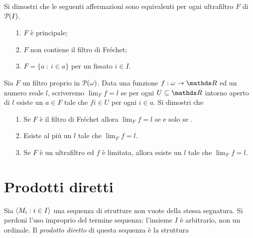 \begin{exercise}
Si dimostri che le seguenti affermazioni sono equivalenti per ogni ultrafiltro $F$ di $\P(I)$.\nobreak
\begin{itemize}
\item[1.] $F$ \`e principale;
\item[2.] $F$ non contiene il filtro di Fr\'echet;
\item[3.] $F=\{a\ :\ i\in a\}$ per un fissato $i\in I$.\QED
\end{itemize}
\end{exercise}


\begin{exercise}\label{exlimiteultrafiltro}
Sia $F$ un filtro proprio in $\P(\omega)$. Data una funzione $f:\omega\imp\RR$ ed un numero reale $l$, scriveremo $\lim_{F} f= l$ se per ogni $U\subseteq\RR$ intorno aperto di $l$ esiste un $a\in F$ tale che $fi\in U$ per ogni $i\in a$. Si dimostri che
\begin{itemize}
\item[1.] Se $F$ \`e il filtro di Fr\'echet allora $\lim_{F} f= l$ se e solo se  .
\item[2.] Esiste al pi\`u un $l$ tale che $\lim_{F} f= l$.
\item[3.] Se $F$ \`e un ultrafiltro ed $f$ \`e limitata, allora esiste un $l$ tale che  $\lim_{F} f= l$.\QED
\end{itemize}
\end{exercise}



\section{Prodotti diretti}
\label{prodottidiretti}

\def\ceq#1#2#3{\parbox{20ex}{$\displaystyle #1$}\parbox{6ex}{\hfil$\displaystyle #2$}\rlap{$\displaystyle  #3$}\hspace{20ex}}

Sia $\<M_i:i\in I\>$ una sequenza di strutture non vuote della stessa segnatura. Si perdoni l'uso improprio del termine sequenza: l'insieme $I$ \`e arbitrario, non un ordinale. Il \emph{prodotto diretto\/} di questa sequenza \`e la struttura

